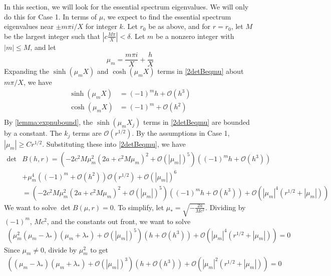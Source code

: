\documentclass[thesis.tex]{subfiles}
\begin{document}
In this section, we will look for the essential spectrum eigenvalues. We will only do this for Case 1. In terms of $\mu$, we expect to find the essential spectrum eigenvalues near $\pm m \pi i/X$ for integer $k$. Let $r_0$ be as above, and for $r = r_0$, let $M$ be the largest integer such that $\left| c \frac{M \pi}{X} \right| < \delta$. Let $m$ be a nonzero integer with $|m| \leq M$, and let
\[
\mu_m = \frac{m \pi i}{X} + \frac{h}{X}
\]
Expanding the $\sinh(\mu_m X)$ and $\cosh(\mu_m X)$ terms in \cref{2detBeqmu} about $m \pi/X$, we have
\begin{align*}
\sinh(\mu_m X) &= (-1)^m h + \mathcal{O}(h^3) \\
\cosh(\mu_m X) &= (-1)^m + \mathcal{O}(h^2) \\
\end{align*}
By \cref{lemma:expnubound}, the $\sinh(\mu_m X_j)$ terms in \cref{2detBeqmu} are bounded by a constant. The $k_j$ terms are $\mathcal{O}(r^{1/2})$. By the assumptions in Case 1, $|\mu_m| \geq C r^{1/2}$. Substituting these into \cref{2detBeqmu}, we have 
\begin{equation}\label{Bess1}
\begin{aligned}
\det &B(h, r) = \left(-2 c^2 M  \mu_m^2 \left( 2a + c^2 M \mu_m \right)^2 + \mathcal{O}( |\mu_m|)^5 \right) \left( (-1)^m h + \mathcal{O}(h^3) \right) \\
&+ \mu_m^4 \left( (-1)^m + \mathcal{O}(h^2)\right)\mathcal{O}(r^{1/2}) + \mathcal{O}\left( |\mu_m| \right)^6 \\
&= \left(-2 c^2 M  \mu_m^2 \left( 2a + c^2 M \mu_m \right)^2 + \mathcal{O}( |\mu_m|)^5 \right) \left( (-1)^m h + \mathcal{O}(h^3) \right) + \mathcal{O}\left( |\mu_m|^4(r^{1/2} + |\mu_m|) \right)
\end{aligned}
\end{equation}
We want to solve $\det B(\mu, r) = 0$. To simplify, let $\mu_* = \sqrt{-\frac{2a}{M c^2}}$. Dividing by $(-1)^m$, $M c^2$, and the constants out front, we want to solve 
\begin{equation}\label{Bess2}
\begin{aligned}
\left(\mu_m^2 (\mu_m - \lambda_*)(\mu_m + \lambda_*) + \mathcal{O}( |\mu_m|)^5 \right) \left( h + \mathcal{O}(h^3) \right) + \mathcal{O}\left( |\mu_m|^4(r^{1/2} + |\mu_m|) \right) = 0
\end{aligned}
\end{equation}
Since $\mu_m \neq 0$, divide by $\mu_m^2$ to get
\begin{equation}\label{Bess3}
\begin{aligned}
\left((\mu_m - \lambda_*)(\mu_m + \lambda_*) + \mathcal{O}( |\mu_m|)^3 \right) \left( h + \mathcal{O}(h^3) \right) + \mathcal{O}\left( |\mu_m|^2(r^{1/2} + |\mu_m|) \right) = 0
\end{aligned}
\end{equation}
\end{document}
